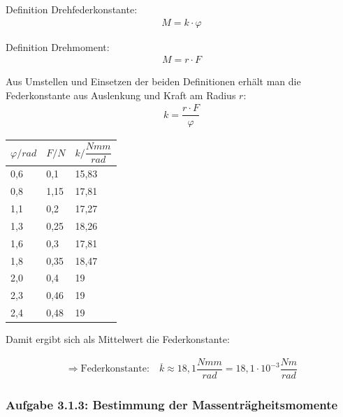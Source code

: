 \documentclass[a4paper]{scrartcl}
\numberwithin{equation}{subsection}
\begin{document}
Definition Drehfederkonstante:
\begin{align}
M = k \cdot \varphi
\end{align}

Definition Drehmoment:
\begin{align}
M = r \cdot F
\end{align}

Aus Umstellen und Einsetzen der beiden Definitionen erhält man die Federkonstante aus Auslenkung und Kraft am Radius $r$:
\begin{align}
k = \dfrac{r \cdot F}{\varphi}
\end{align}

\begin{table}[H]
\begin{tabular}{|l|l|l|}
\hline
\textbf{$\varphi/rad$} & \textbf{$F/N$} & \textbf{$k/\dfrac{Nmm}{rad}$} \\ \hline
0,6                    & 0,1            & 15,83                         \\ \hline
0,8                    & 1,15           & 17,81                         \\ \hline
1,1                    & 0,2            & 17,27                         \\ \hline
1,3                    & 0,25           & 18,26                         \\ \hline
1,6                    & 0,3            & 17,81                         \\ \hline
1,8                    & 0,35           & 18,47                         \\ \hline
2,0                    & 0,4            & 19                            \\ \hline
2,3                    & 0,46           & 19                            \\ \hline
2,4                    & 0,48           & 19                            \\ \hline
\end{tabular}
\centering
\end{table}

Damit ergibt sich als Mittelwert die Federkonstante:

\begin{align*}
\Rightarrow \text{Federkonstante:} \quad \overline{k} \approx 18,1 \dfrac{Nmm}{rad} = 18,1 \cdot 10^{-3} \dfrac{Nm}{rad}
\end{align*}

\subsubsection{Aufgabe 3.1.3: Bestimmung der Massenträgheitsmomente}
\end{document}
